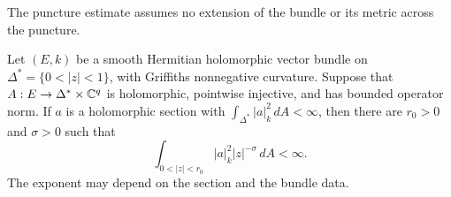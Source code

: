 The puncture estimate assumes no extension of the bundle or its metric
across the puncture.

\begin{lemma}\label{lem:extra-integrability}
Let $(E,k)$ be a smooth Hermitian holomorphic vector bundle on
$\Delta^*=\{0<|z|<1\}$, with Griffiths nonnegative curvature.
Suppose that $A:E\to\Delta^*\times\mathbb C^q$ is holomorphic, pointwise
injective, and has bounded operator norm.  If $a$ is a holomorphic
section with $\int_{\Delta^*}|a|_k^2\,dA<\infty$, then there are
$r_0>0$ and $\sigma>0$ such that
\begin{equation}\label{disc:extra-integrability}
 \int_{0<|z|<r_0}|a|_k^2|z|^{-\sigma}\,dA<\infty.
\end{equation}
The exponent may depend on the section and the bundle data.
\end{lemma}

